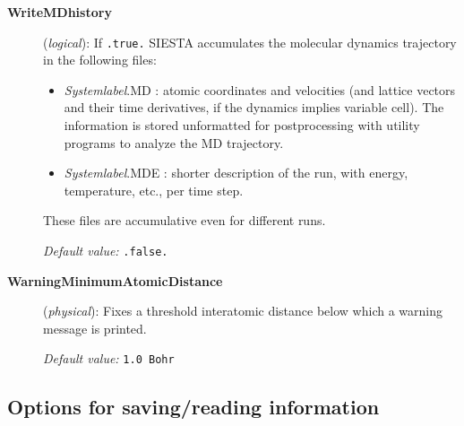 \begin{description}
 
\item[{\bf WriteMDhistory}] ({\it logical}):
If {\tt .true.} SIESTA accumulates the molecular dynamics
trajectory in the following files:
\begin{itemize}
\item
{\it Systemlabel}.MD : atomic coordinates and velocities (and
lattice vectors and their time derivatives, if the dynamics implies
variable cell). The information is stored unformatted for postprocessing
with utility programs to analyze the MD trajectory. 
\item
{\it Systemlabel}.MDE : shorter description of the run, with energy,
temperature, etc., per time step.
\end{itemize}
These files are accumulative even for different runs.
 
{\it Default value:} {\tt .false.}


\item[{\bf WarningMinimumAtomicDistance}] ({\it physical}): 
Fixes a threshold interatomic distance below which a warning
message is printed.

{\it Default value:} {\tt 1.0 Bohr}

        
\end{description}



\vspace{5pt}
\subsection{Options for saving/reading information}

